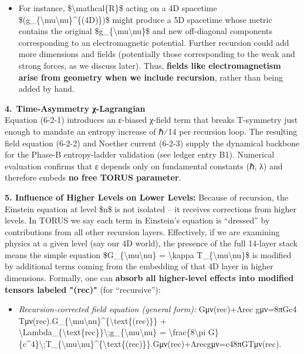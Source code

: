 \documentclass[]{article}
\begin{document}
\begin{itemize}
\item
  For instance, \$\textbackslash{}mathcal\{R\}\$ acting on a 4D
  spacetime
  \$(g\_\{\textbackslash{}mu\textbackslash{}nu\}\^{}\{(4D)\})\$ might
  produce a 5D spacetime whose metric contains the original
  \$g\_\{\textbackslash{}mu\textbackslash{}nu\}\$ and new off-diagonal
  components corresponding to an electromagnetic potential. Further
  recursion could add more dimensions and fields (potentially those
  corresponding to the weak and strong forces, as we discuss later).
  Thus, \textbf{fields like electromagnetism arise from geometry when we
  include recursion}, rather than being added by hand.
\end{itemize}

\textbf{4. Time-Asymmetry χ-Lagrangian}\\
Equation (6-2-1) introduces an ε-biased χ-field term that breaks
T-symmetry just enough to mandate an entropy increase of ℏ⁄14 per
recursion loop. The resulting field equation (6-2-2) and Noether current
(6-2-3) supply the dynamical backbone for the Phase-B entropy-ladder
validation (see ledger entry B1). Numerical evaluation confirms that ε
depends only on fundamental constants (ℏ, λ) and therefore embeds
\textbf{no free TORUS parameter}.

\textbf{5. Influence of Higher Levels on Lower Levels:} Because of
recursion, the Einstein equation at level \$n\$ is not isolated -- it
receives corrections from higher levels. In TORUS we say each term in
Einstein's equation is ``dressed'' by contributions from all other
recursion layers​. Effectively, if we are examining physics at a given
level (say our 4D world), the presence of the full 14-layer stack means
the simple equation \$G\_\{\textbackslash{}mu\textbackslash{}nu\} =
\textbackslash{}kappa T\_\{\textbackslash{}mu\textbackslash{}nu\}\$ is
modified by additional terms coming from the embedding of that 4D layer
in higher dimensions. Formally, one can \textbf{absorb all higher-level
effects into modified tensors labeled "(rec)"} (for ``recursive'')​:

\begin{itemize}
\item
  \emph{Recursion-corrected field equation (general form):}
  Gμν(rec)+Λrec  gμν=8πGc4  Tμν(rec).G\_\{\textbackslash{}mu\textbackslash{}nu\}\^{}\{\textbackslash{}text\{(rec)\}\}
  +
  \textbackslash{}Lambda\_\{\textbackslash{}text\{rec\}\}\textbackslash{};g\_\{\textbackslash{}mu\textbackslash{}nu\}
  = \textbackslash{}frac\{8\textbackslash{}pi
  G\}\{c\^{}4\}\textbackslash{};T\_\{\textbackslash{}mu\textbackslash{}nu\}\^{}\{\textbackslash{}text\{(rec)\}\}.Gμν(rec)​+Λrec​gμν​=c48πG​Tμν(rec)​.
\end{itemize}
\end{document}
